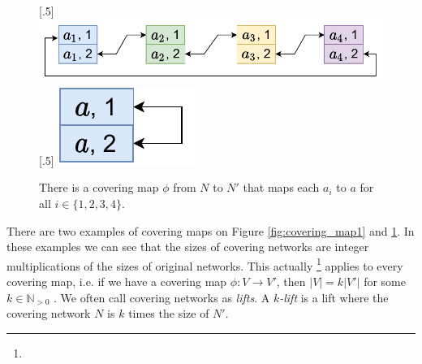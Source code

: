 \begin{figure}[H]
    [.5\linewidth] {
    \centering
    \includegraphics[scale=0.55]{diagrams/covering_map_3.pdf}
  }
  \hfill
    [.5\linewidth] {
    \centering
    \includegraphics[scale=0.55]{diagrams/covering_map_4.pdf}
  }
  \caption{There is a covering map $\phi$ from $N$ to $N'$ that maps each $a_i$ to $a$ for all $i \in \{1, 2, 3, 4\}$.
  }
  \label{fig:covering_map2}
\end{figure}

There are two examples of covering maps on Figure \ref{fig:covering_map1} and \ref{fig:covering_map2}.
In these examples we can see that the sizes of covering networks are integer multiplications of the sizes of original networks.
This actually
\footnote{}
applies to every covering map, i.e. if we have a covering map $\phi\colon V \rightarrow V'$, then $|V| = k|V'|$ for some $k \in \mathbb{N}_{>0}$ \cite{DBLP:journals/dm/GrossT77}.
We often call covering networks as \emph{lifts}.
A \emph{$k$-lift} is a lift where the covering network $N$ is $k$ times the size of $N'$.





